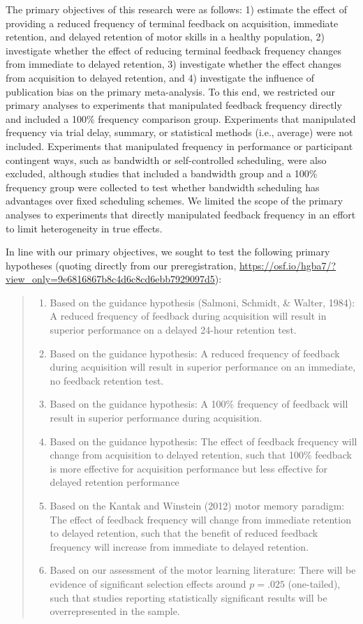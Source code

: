 \documentclass[
  english,
  man, donotrepeattitle,mask,floatsintext]{apa7}
\providecommand{\tightlist}{%
  \setlength{\itemsep}{0pt}\setlength{\parskip}{0pt}}
\begin{document}
The primary objectives of this research were as follows: 1) estimate the effect of providing a reduced frequency of terminal feedback on acquisition, immediate retention, and delayed retention of motor skills in a healthy population, 2) investigate whether the effect of reducing terminal feedback frequency changes from immediate to delayed retention, 3) investigate whether the effect changes from acquisition to delayed retention, and 4) investigate the influence of publication bias on the primary meta-analysis. To this end, we restricted our primary analyses to experiments that manipulated feedback frequency directly and included a 100\% frequency comparison group. Experiments that manipulated frequency via trial delay, summary, or statistical methods (i.e., average) were not included. Experiments that manipulated frequency in performance or participant contingent ways, such as bandwidth or self-controlled scheduling, were also excluded, although studies that included a bandwidth group and a 100\% frequency group were collected to test whether bandwidth scheduling has advantages over fixed scheduling schemes. We limited the scope of the primary analyses to experiments that directly manipulated feedback frequency in an effort to limit heterogeneity in true effects.

In line with our primary objectives, we sought to test the following primary hypotheses (quoting directly from our preregistration, \url{https://osf.io/hgba7/?view_only=9e6816867b8c4d6c8cd6ebb7929097d5}):

\begin{quote}
\begin{enumerate}
\def\labelenumi{\arabic{enumi})}
\tightlist
\item
  Based on the guidance hypothesis (Salmoni, Schmidt, \& Walter, 1984): A reduced frequency of feedback during acquisition will result in superior performance on a delayed 24-hour retention test.
\item
  Based on the guidance hypothesis: A reduced frequency of feedback during acquisition will result in superior performance on an immediate, no feedback retention test.
\item
  Based on the guidance hypothesis: A 100\% frequency of feedback will result in superior performance during acquisition.
\item
  Based on the guidance hypothesis: The effect of feedback frequency will change from acquisition to delayed retention, such that 100\% feedback is more effective for acquisition performance but less effective for delayed retention performance
\item
  Based on the Kantak and Winstein (2012) motor memory paradigm: The effect of feedback frequency will change from immediate retention to delayed retention, such that the benefit of reduced feedback frequency will increase from immediate to delayed retention.
\item
  Based on our assessment of the motor learning literature: There will be evidence of significant selection effects around \(p = .025\) (one-tailed), such that studies reporting statistically significant results will be overrepresented in the sample.
\end{enumerate}
\end{quote}
\end{document}
